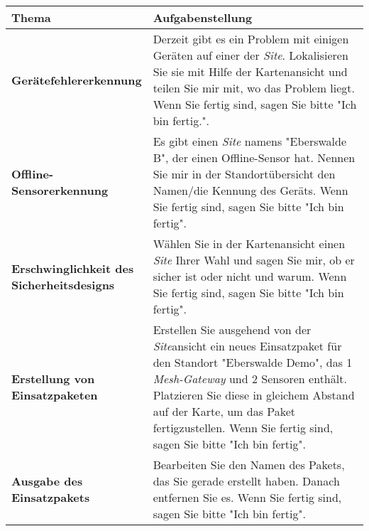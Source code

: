 \begin{table}[H]
  \begin{tabular}{p{0.3\linewidth} |p{0.7\linewidth}}
    Thema                                             & Aufgabenstellung                                                                                                                                                                                                                                                                                                  \\ \hline\hline

    \textbf{Gerätefehlererkennung}                    & Derzeit gibt es ein Problem mit einigen Geräten auf einer der \textit{Site}. Lokalisieren Sie sie mit Hilfe der Kartenansicht und teilen Sie mir mit, wo das Problem liegt. Wenn Sie fertig sind, sagen Sie bitte "Ich bin fertig.".                                                                              \\\hline
    \textbf{Offline-Sensorerkennung}                  & Es gibt einen \textit{Site} namens "Eberswalde B", der einen Offline-Sensor hat. Nennen Sie mir in der Standortübersicht den Namen/die Kennung des Geräts. Wenn Sie fertig sind, sagen Sie bitte "Ich bin fertig".                                                                                                \\\hline
    \textbf{Erschwinglichkeit des Sicherheitsdesigns} & Wählen Sie in der Kartenansicht einen \textit{Site} Ihrer Wahl und sagen Sie mir, ob er sicher ist oder nicht und warum. Wenn Sie fertig sind, sagen Sie bitte "Ich bin fertig".                                                                                                                                  \\\hline
    \textbf{Erstellung von Einsatzpaketen}            & Erstellen Sie ausgehend von der \textit{Site}ansicht ein neues Einsatzpaket für den Standort "Eberswalde Demo", das 1 \textit{Mesh-Gateway} und 2 Sensoren enthält. Platzieren Sie diese in gleichem Abstand auf der Karte, um das Paket fertigzustellen. Wenn Sie fertig sind, sagen Sie bitte "Ich bin fertig". \\\hline
    \textbf{Ausgabe des Einsatzpakets}                & Bearbeiten Sie den Namen des Pakets, das Sie gerade erstellt haben. Danach entfernen Sie es. Wenn Sie fertig sind, sagen Sie bitte "Ich bin fertig".                                                                                                                                                              \\\hline

\end{tabular}
\end{table}
